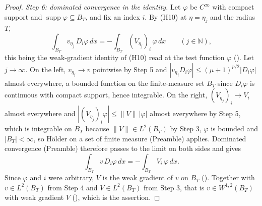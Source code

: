 \begin{proof}
\emph{Step 6: dominated convergence in the identity.}  Let $\varphi$ be
$C^\infty$ with compact support and $\operatorname{supp}\varphi\subseteq B_T$,
and fix an index $i$.  By (H10) at $\eta=\eta_j$ and the radius $T$,
\[
\int_{B_T}v_{\eta_j}\,D_i\varphi\,dx=-\int_{B_T}(V_{\eta_j})_i\,\varphi\,dx
\qquad(j\in\mathbb{N}),
\]
this being the weak-gradient identity of (H10) read at the test function
$\varphi$ ().  Let $j\to\infty$.  On the left,
$v_{\eta_j}\to v$ pointwise by Step 5 and
$|v_{\eta_j}D_i\varphi|\le(\mu+1)^{p/2}|D_i\varphi|$ almost everywhere, a
bounded function on the finite-measure set $B_T$ since $D_i\varphi$ is
continuous with compact support, hence integrable.  On the right,
$(V_{\eta_j})_i\to V_i$ almost everywhere and
$|(V_{\eta_j})_i\varphi|\le\|V\|\,|\varphi|$ almost everywhere by Step 5, which
is integrable on $B_T$ because $\|V\|\in L^2(B_T)$ by Step 3, $\varphi$ is
bounded and $|B_T|<\infty$, so H\"older on a set of finite measure (Preamble)
applies.  Dominated convergence (Preamble) therefore passes to the limit on
both sides and gives
\[
\int_{B_T}v\,D_i\varphi\,dx=-\int_{B_T}V_i\,\varphi\,dx .
\]
Since $\varphi$ and $i$ were arbitrary, $V$ is the weak gradient of $v$ on
$B_T$ ().  Together with $v\in L^2(B_T)$ from
Step 4 and $V\in L^2(B_T)$ from Step 3, that is $v\in W^{1,2}(B_T)$ with weak
gradient $V$ (), which is the assertion.
\end{proof}
